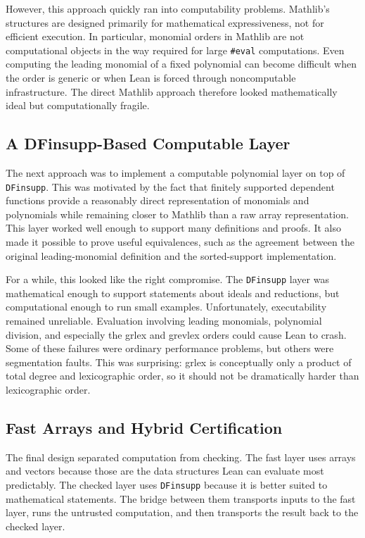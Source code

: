 \documentclass[acmsmall,nonacm,screen]{acmart}
\begin{document}
However, this approach quickly ran into computability problems.
Mathlib's structures are designed primarily for mathematical expressiveness, not for efficient
execution.
In particular, monomial orders in Mathlib are not computational objects in the way required for
large \texttt{\#eval} computations.
Even computing the leading monomial of a fixed polynomial can become difficult when the order is
generic or when Lean is forced through noncomputable infrastructure.
The direct Mathlib approach therefore looked mathematically ideal but computationally fragile.

\subsection{A DFinsupp-Based Computable Layer}

The next approach was to implement a computable polynomial layer on top of \texttt{DFinsupp}.
This was motivated by the fact that finitely supported dependent functions provide a reasonably
direct representation of monomials and polynomials while remaining closer to Mathlib than a raw
array representation.
This layer worked well enough to support many definitions and proofs.
It also made it possible to prove useful equivalences, such as the agreement between the original
leading-monomial definition and the sorted-support implementation.

For a while, this looked like the right compromise.
The \texttt{DFinsupp} layer was mathematical enough to support statements about ideals and
reductions, but computational enough to run small examples.
Unfortunately, executability remained unreliable.
Evaluation involving leading monomials, polynomial division, and especially the grlex and grevlex
orders could cause Lean to crash.
Some of these failures were ordinary performance problems, but others were segmentation faults.
This was surprising: grlex is conceptually only a product of total degree and lexicographic order,
so it should not be dramatically harder than lexicographic order.

\subsection{Fast Arrays and Hybrid Certification}

The final design separated computation from checking.
The fast layer uses arrays and vectors because those are the data structures Lean can evaluate most
predictably.
The checked layer uses \texttt{DFinsupp} because it is better suited to mathematical statements.
The bridge between them transports inputs to the fast layer, runs the untrusted computation, and
then transports the result back to the checked layer.
\end{document}
